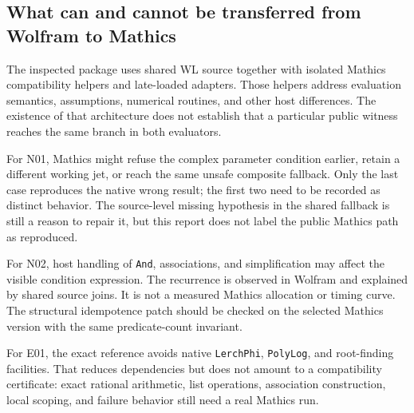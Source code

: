 \documentclass[11pt,a4paper]{article}
\begin{document}
\subsection{What can and cannot be transferred from Wolfram to Mathics}
The inspected package uses shared WL source together with isolated Mathics compatibility helpers and late-loaded adapters. Those helpers address evaluation semantics, assumptions, numerical routines, and other host differences. The existence of that architecture does not establish that a particular public witness reaches the same branch in both evaluators.\cite{core,mathics,mathicsassumptions,mathicsnumerical}

For N01, Mathics might refuse the complex parameter condition earlier, retain a different working jet, or reach the same unsafe composite fallback. Only the last case reproduces the native wrong result; the first two need to be recorded as distinct behavior. The source-level missing hypothesis in the shared fallback is still a reason to repair it, but this report does not label the public Mathics path as reproduced.

For N02, host handling of \texttt{And}, associations, and simplification may affect the visible condition expression. The recurrence is observed in Wolfram and explained by shared source joins. It is not a measured Mathics allocation or timing curve. The structural idempotence patch should be checked on the selected Mathics version with the same predicate-count invariant.

For E01, the exact reference avoids native \texttt{LerchPhi}, \texttt{PolyLog}, and root-finding facilities. That reduces dependencies but does not amount to a compatibility certificate: exact rational arithmetic, list operations, association construction, local scoping, and failure behavior still need a real Mathics run.
\end{document}
